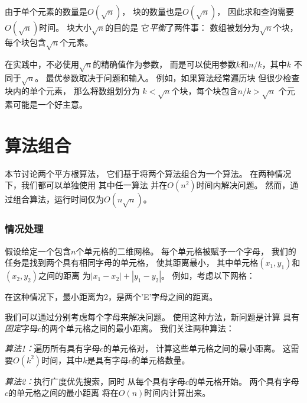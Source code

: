 由于单个元素的数量是$O(\sqrt n)$，
块的数量也是$O(\sqrt n)$，
因此求和查询需要$O(\sqrt n)$时间。
块大小$\sqrt n$的目的是
它\emph{平衡}了两件事：
数组被划分为$\sqrt n$个块，
每个块包含$\sqrt n$个元素。

在实践中，不必使用$\sqrt n$的精确值作为参数，
而是可以使用参数$k$和$n/k$，其中$k$
不同于$\sqrt n$。
最优参数取决于问题和输入。
例如，如果算法经常遍历块
但很少检查块内的单个元素，
那么将数组划分为
$k < \sqrt n$个块，每个块包含$n/k > \sqrt n$
个元素可能是一个好主意。

\section{算法组合}

本节讨论两个平方根算法，
它们基于将两个算法组合为一个算法。
在两种情况下，我们都可以单独使用
其中任一算法
并在$O(n^2)$时间内解决问题。
然而，通过组合算法，运行时间仅为$O(n \sqrt n)$。

\subsubsection{情况处理}

假设给定一个包含$n$个单元格的二维网格。
每个单元格被赋予一个字母，
我们的任务是找到两个具有相同字母的单元格，
使其距离最小，
其中单元格$(x_1,y_1)$和$(x_2,y_2)$之间的距离
为$|x_1-x_2|+|y_1-y_2|$。
例如，考虑以下网格：

\begin{center}
\end{center}
在这种情况下，最小距离为2，是两个'E'字母之间的距离。

我们可以通过分别考虑每个字母来解决问题。
使用这种方法，新问题是计算
具有\emph{固定}字母$c$的两个单元格之间的最小距离。
我们关注两种算法：

\emph{算法1：}遍历所有具有字母$c$的单元格对，
计算这些单元格之间的最小距离。
这需要$O(k^2)$时间，其中$k$是具有字母$c$的单元格数量。

\emph{算法2：}执行广度优先搜索，同时
从每个具有字母$c$的单元格开始。
两个具有字母$c$的单元格之间的最小距离
将在$O(n)$时间内计算出来。

